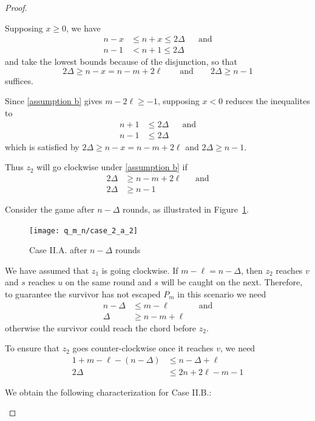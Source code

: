 \begin{proof}
\begin{proofpart}
\begin{itemize}
  Supposing $x\geq 0$, we have
  \begin{align*}
   n-x &\leq n+x \leq 2 \Delta && \text{and} \\
   n-1 &< n+1 \leq 2 \Delta
  \end{align*}
  and take the lowest bounds because of the disjunction, so that
   \[2\Delta \geq n-x = n-m+2\ell \qquad \text{and} \qquad 2\Delta \geq n-1\]
    suffices.

  Since \ref{assumption b} gives $m-2\ell \geq -1$, supposing $x < 0$ reduces the inequalites to
  \begin{align*}
   n+1 &\leq 2 \Delta && \text{and} \\
   n-1 &\leq 2 \Delta
  \end{align*}
  which is satisfied by $2\Delta \geq n-x = n-m+2\ell$ and $2\Delta \geq n-1$.

  Thus $z_2$ will go clockwise under \ref{assumption b} if
  \begin{align*}
   2\Delta &\geq n-m+2\ell && \text{and} \\
    2\Delta &\geq n-1
  \end{align*}

  Consider the game after $n-\Delta$ rounds, as illustrated in Figure~\ref{fig:case_2_a_2}.

  \begin{figure}
    \centering
    \texttt{[image: q\_m\_n/case\_2\_a\_2]}
    \caption{Case II.A. after $n-\Delta$ rounds \label{fig:case_2_a_2}}
  \end{figure}

  We have assumed that $z_1$ is going clockwise. If $m - \ell = n - \Delta$,
  then $z_2$ reaches $v$ and $s$ reaches $u$ on the same round and $s$
  will be caught on the next. Therefore, to guarantee the survivor has not
  escaped $P_m$ in this scenario we need
  \begin{align*}
   n - \Delta &\leq m - \ell   && \text{and}  \\
   \Delta &\geq n - m + \ell
  \end{align*}
  otherwise the survivor could reach the chord before $z_2$.

  To ensure that $z_2$ goes counter-clockwise once it reaches $v$, we need
  \begin{align*}
   1 + m - \ell - (n - \Delta) &\leq n - \Delta + \ell  \\
   2 \Delta &\leq 2n + 2\ell - m - 1
  \end{align*}

  We obtain the following characterization for Case II.B.:


\end{itemize}
\end{proofpart}
\end{proof}
